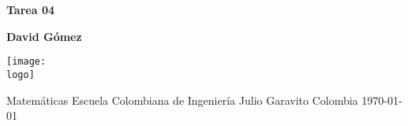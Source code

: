 \documentclass{article}
\newcommand{\logo}{C:/Users/usuario/Documents/U/logo-eci.jpg}
\begin{document}

\begin{titlepage}
    \begin{center}
        \vspace*{1cm}

        \textbf{\Huge{Tarea 04}}

        \vspace{1.5cm}

        \textbf{\large{David Gómez}}

        \vspace{4cm}

        \texttt{[image: \\logo]}

        \vspace{5cm}

        Matemáticas\linebreak
        Escuela Colombiana de Ingeniería Julio Garavito\linebreak
        Colombia\linebreak
        \today

    \end{center}
\end{titlepage}
\clearpage
\tableofcontents
\clearpage
\end{document}
